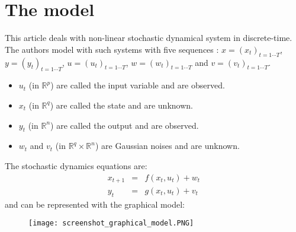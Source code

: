 \section{The model}

This article deals with non-linear stochastic dynamical system in discrete-time.
The authors model with such systems with five sequences :
$x=(x_t)_{t=1\cdots T}$, $y=(y_t)_{t=1\cdots T}$, $u=(u_t)_{t=1 \cdots T}$, $w=(w_t)_{t=1 \cdots T}$ and $v=(v_t)_{t=1 \cdots T}$.

\begin{itemize}
  \item $u_t$ (in $\mathbb{R}^p$) are called the input variable and are observed.
  \item $x_t$ (in $\mathbb{R}^q$) are called the state and are unknown.
  \item $y_t$ (in $\mathbb{R}^n$) are called the output and are observed.
  \item $w_t$ and $v_t$ (in $\mathbb{R}^q \times \mathbb{R}^n$) are Gaussian noises and are unknown.
\end{itemize}

The stochastic dynamics equations are:
\begin{eqnarray}
x_{t+1}&=& f(x_t,u_t)+w_t\\
y_t &=& g(x_t,u_t)+v_t
\end{eqnarray}
and can be represented with the graphical model:
\begin{figure}[H]
	\texttt{[image: screenshot\_graphical\_model.PNG]}
\end{figure}
